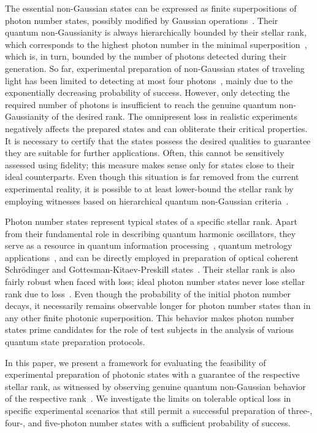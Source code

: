 \documentclass{optica-article}
\begin{document}
The essential non-Gaussian states can be expressed as finite superpositions of photon number states, possibly modified by Gaussian operations~\cite{lachman2019,fiurasek2022,walschaers2021,chabaud2020}. Their quantum non-Gaussianity is always hierarchically bounded by their stellar rank, which corresponds to the highest photon number in the minimal superposition~\cite{walschaers2021,lachman2019,fiurasek2022}, which is, in turn, bounded by the number of photons detected during their generation. So far, experimental preparation of non-Gaussian states of traveling light has been limited to detecting at most four photons~\cite{engelkemeier2021,endo2025}, mainly due to the exponentially decreasing probability of success.
%
However, only detecting the required number of photons is insufficient to reach the genuine quantum non-Gaussianity of the desired rank. The omnipresent loss in realistic experiments negatively affects the prepared states and can obliterate their critical properties. It is necessary to certify that the states possess the desired qualities to guarantee they are suitable for further applications. Often, this cannot be sensitively assessed using fidelity; this measure makes sense only for states close to their ideal counterparts. Even though this situation is far removed from the current experimental reality, it is possible to at least lower-bound the stellar rank by employing witnesses based on hierarchical quantum non-Gaussian criteria~\cite{lachman2019,fiurasek2022}.

Photon number states represent typical states of a specific stellar rank. Apart from their fundamental role in describing quantum harmonic oscillators, they serve as a resource in quantum information processing~\cite{marek2009}, quantum metrology applications~\cite{kunitski2019,oh2020}, and can be directly employed in preparation of optical coherent Schr\"{o}dinger and Gottesman-Kitaev-Preskill states~\cite{winnel2024}. Their stellar rank is also fairly robust when faced with loss; ideal photon number states never lose stellar rank due to loss~\cite{lachman2019}. Even though the probability of the initial photon number decays, it necessarily remains observable longer for photon number states than in any other finite photonic superposition. This behavior makes photon number states prime candidates for the role of test subjects in the analysis of various quantum state preparation protocols.

In this paper, we present a framework for evaluating the feasibility of experimental preparation of photonic states with a guarantee of the respective stellar rank, as witnessed by observing genuine quantum non-Gaussian behavior of the respective rank~\cite{lachman2019}. We investigate the limits on tolerable optical loss in specific experimental scenarios that still permit a successful preparation of three-, four-, and five-photon number states with a sufficient probability of success.
 
\end{document}

